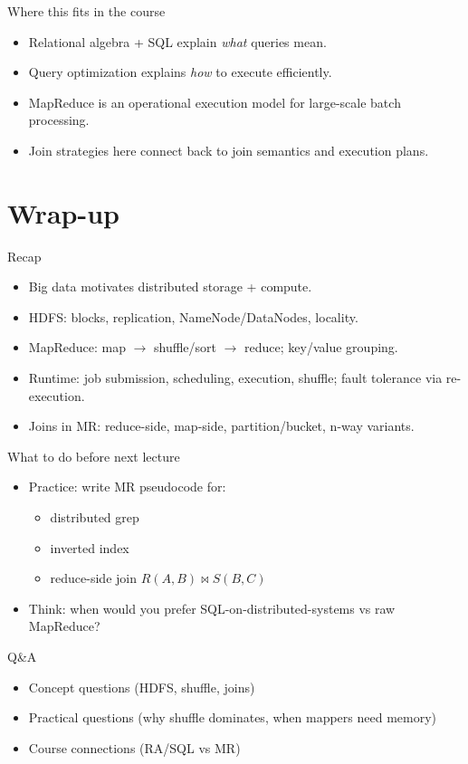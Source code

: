 \documentclass[10pt,aspectratio=169]{beamer}
\begin{document}
\begin{frame}{Where this fits in the course}
\begin{itemize}
  \item Relational algebra + SQL explain \emph{what} queries mean.
  \item Query optimization explains \emph{how} to execute efficiently.
  \item MapReduce is an operational execution model for large-scale batch processing.
  \item Join strategies here connect back to join semantics and execution plans.
\end{itemize}
\end{frame}

\section{Wrap-up}

\begin{frame}{Recap}
\begin{itemize}
  \item Big data motivates distributed storage + compute.
  \item HDFS: blocks, replication, NameNode/DataNodes, locality.
  \item MapReduce: map $\rightarrow$ shuffle/sort $\rightarrow$ reduce; key/value grouping.
  \item Runtime: job submission, scheduling, execution, shuffle; fault tolerance via re-execution.
  \item Joins in MR: reduce-side, map-side, partition/bucket, n-way variants.
\end{itemize}
\end{frame}

\begin{frame}{What to do before next lecture}
\begin{itemize}
  \item Practice: write MR pseudocode for:
  \begin{itemize}
    \item distributed grep
    \item inverted index
    \item reduce-side join \(R(A,B)\Join S(B,C)\)
  \end{itemize}
  \item Think: when would you prefer SQL-on-distributed-systems vs raw MapReduce?
\end{itemize}
\end{frame}

\begin{frame}{Q\&A}
\begin{itemize}
  \item Concept questions (HDFS, shuffle, joins)
  \item Practical questions (why shuffle dominates, when mappers need memory)
  \item Course connections (RA/SQL vs MR)
\end{itemize}
\end{frame}
\end{document}
